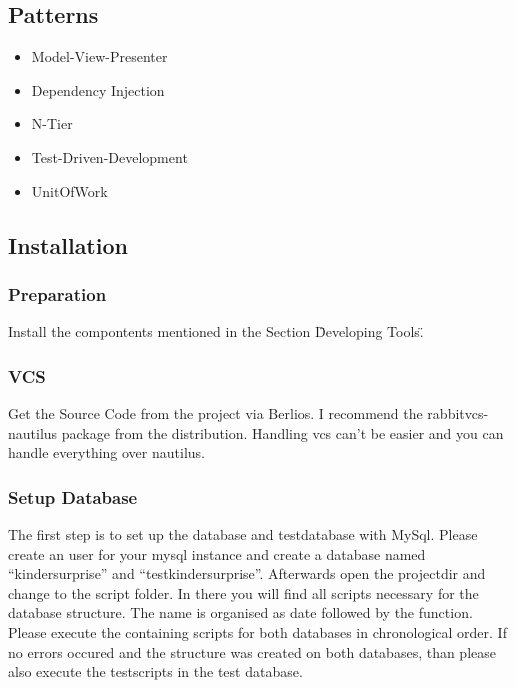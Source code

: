 \documentclass{article}
\begin{document}
\subsection{Patterns}
\begin{itemize}
  \item Model-View-Presenter
  \item Dependency Injection
  \item N-Tier
  \item Test-Driven-Development
  \item UnitOfWork
\end{itemize}

\subsection{Installation}

\subsubsection{Preparation}

Install the compontents mentioned in the Section \"Developing Tools\".

\subsubsection{VCS}

Get the Source Code from the project via Berlios.
I recommend the rabbitvcs-nautilus package from the distribution. Handling vcs
can't be easier and you can handle everything over nautilus.

\subsubsection{Setup Database}
The first step is to set up the database and testdatabase with MySql.
Please create an user for your mysql instance and create a database named
``kindersurprise'' and ``testkindersurprise''.
Afterwards open the projectdir and change to the script folder.
In there you will find all scripts necessary for the database structure. The
name is organised as date followed by the function.
Please execute the containing scripts for both databases in chronological order.
If no errors occured and the structure was created on both databases, than
please also execute the testscripts in the test database.
\end{document}
